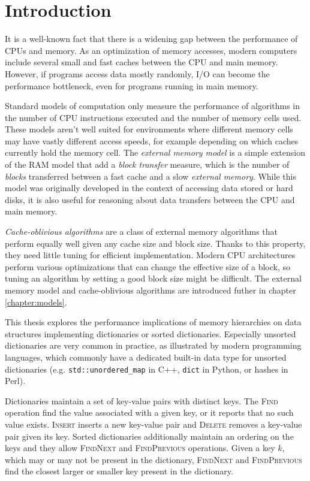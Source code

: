 \chapter*{Introduction}

It is a well-known fact that there is a widening gap between
the performance of CPUs and memory. As an optimization of memory accesses,
modern computers include several small and fast caches between the CPU and
main memory. However, if programs access data mostly randomly, I/O can become
the performance bottleneck, even for programs running in main memory.

Standard models of computation only measure the performance of algorithms
in the number of CPU instructions executed and the number of memory cells used.
These models aren't well suited for environments where different memory cells
may have vastly different access speeds, for example depending on which caches
currently hold the memory cell. The \textit{external memory model} is a simple
extension of the RAM model that add a \textit{block transfer} measure, which
is the number of \textit{blocks} transferred between a fast cache and a slow
\textit{external memory}. While this model was originally developed
in the context of accessing data stored or hard disks, it is also useful
for reasoning about data transfers between the CPU and main memory.

\textit{Cache-oblivious algorithms} are a class of external memory algorithms
that perform equally well given any cache size and block size. Thanks to this
property, they need little tuning for efficient implementation.
Modern CPU architectures perform various optimizations that can change
the effective size of a block, so tuning an algorithm by setting a good block
size might be difficult.
The external memory model and cache-oblivious algorithms are introduced futher
in chapter \ref{chapter:models}.

This thesis explores the performance implications of memory hierarchies
on data structures implementing dictionaries or sorted dictionaries.
Especially unsorted dictionaries are very common in practice, as illustrated
by modern programming languages, which commonly have a dedicated built-in
data type for unsorted dictionaries (e.g. \texttt{std::unordered\_map} in C++,
\texttt{dict} in Python, or hashes in Perl).

Dictionaries maintain a set of key-value pairs with distinct keys.
The \textsc{Find} operation find the value associated with a given key, or
it reports that no such value exists. \textsc{Insert} inserts a new
key-value pair and \textsc{Delete} removes a key-value pair given its key.
Sorted dictionaries additionally maintain an ordering on the keys and they
allow \textsc{FindNext} and \textsc{FindPrevious} operations.
Given a key $k$, which may or may not be present in the dictionary,
\textsc{FindNext} and \textsc{FindPrevious} find the closest larger or smaller
key present in the dictionary.

